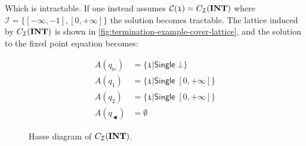 Which is intractable.
If one instead assumes $\mathcal{C}(\texttt{i}) = C_\mathcal{I}(\mathbf{INT})$ where $\mathcal{I} = \{[-\infty, - 1], [0, +\infty]\}$ the solution becomes tractable.
The lattice induced by $C_\mathcal{I}(\mathbf{INT})$ is shown in \autoref{fig:termination-example-cover-lattice}, and the solution to the fixed point equation becomes:

\begin{align}
    A(q_\whitepointerright) &= \{ \texttt{i} |\mathsf{Single}\ \bot \} \\
    A(q_1) &= \{ \texttt{i} | \mathsf{Single} \; [0, +\infty] \} \\
    A(q_2) &= \{ \texttt{i} | \mathsf{Single} \; [0, +\infty] \} \\
    A(q_\blackpointerleft) &= \emptyset
\end{align}

\begin{figure}
    \centering
    
    \caption{Hasse diagram of $C_\mathcal{I}(\mathbf{INT})$.}
    \label{fig:termination-example-cover-lattice}
\end{figure}

